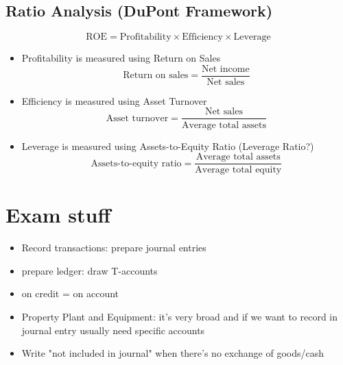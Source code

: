 \documentclass{article}
\begin{document}
\begin{multicols}{2}
\subsection{Ratio Analysis (DuPont Framework)}
$$\text{ROE} = \text{Profitability} \times \text{Efficiency} \times \text{Leverage}$$
\begin{itemize}
	\item Profitability is measured using Return on Sales
	$$\text{Return on sales} = \frac{\text{Net income}}{\text{Net sales}}$$
	\item Efficiency is measured using Asset Turnover
	$$\text{Asset turnover} = \frac{\text{Net sales}}{\text{Average total assets}}$$
	\item Leverage is measured using Assets-to-Equity Ratio (Leverage Ratio?)
	$$\text{Assets-to-equity ratio} = \frac{\text{Average total assets}}{\text{Average total equity}}$$
\end{itemize}



\section{Exam stuff}
\begin{itemize}
	\item Record transactions: prepare journal entries
	\item prepare ledger: draw T-accounts
	\item on credit = on account
	\item Property Plant and Equipment: it's very broad and if we want to record in journal entry usually need specific accounts
	\item Write "not included in journal" when there's no exchange of goods/cash
\end{itemize}
\end{multicols}
\end{document}
